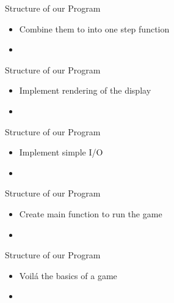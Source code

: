 \documentclass{beamer}
\begin{document}
                    
        \begin{frame}{Structure of our Program}
            \begin{itemize}           
                \item Combine them to into one step function
                    \item \inputminted{haskell}{step.hs}
                    \end{itemize}
        \end{frame}

                    
        \begin{frame}{Structure of our Program}
            \begin{itemize}            
                \item Implement rendering of the display
                    \item \inputminted{haskell}{display.hs}
                    \end{itemize}
        \end{frame}

                    
        \begin{frame}{Structure of our Program}
            \begin{itemize}            
                \item Implement simple I/O
                    \item \inputminted{haskell}{io.hs}
                    \end{itemize}
        \end{frame}
            
                    
        \begin{frame}{Structure of our Program}
            \begin{itemize}            
                \item Create main function to run the game
                    \item \inputminted{haskell}{main.hs}
            \end{itemize}
        \end{frame}
        
        \begin{frame}{Structure of our Program}
            \begin{itemize}            
                \item Voilá the basics of a game
                    \item \inputminted{haskell}{final.hs}
            \end{itemize}
        \end{frame}

    
\end{document}
